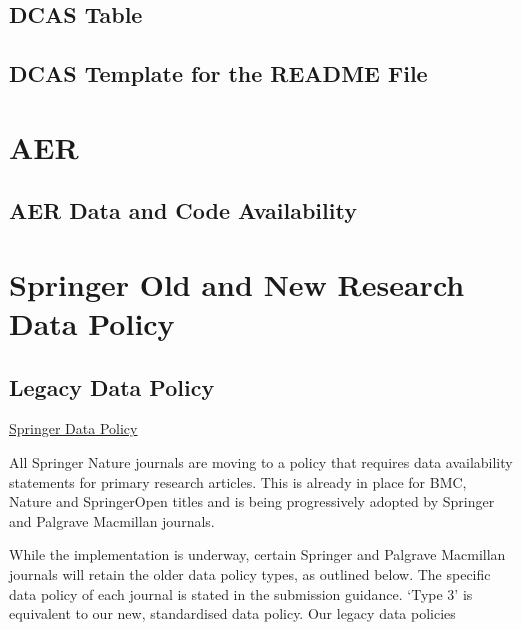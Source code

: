 \documentclass[11pt]{article}
\begin{document}
\subsection{DCAS Table}
\label{dcas_table}


   

\subsection{DCAS Template for the README File}



\section{AER}
\subsection{AER Data and Code Availability}


\section{Springer Old and New Research Data Policy}
\label{springer}
\subsection{Legacy Data Policy}

\href{https://www.springernature.com/gp/authors/research-data-policy/research-data-policy-types}{Springer Data Policy}

All Springer Nature journals are moving to a policy that requires data availability statements for primary research articles. This is already in place for BMC, Nature and SpringerOpen titles and is being progressively adopted by Springer and Palgrave Macmillan journals.

While the implementation is underway, certain Springer and Palgrave Macmillan journals will retain the older data policy types, as outlined below. The specific data policy of each journal is stated in the submission guidance. ‘Type 3’ is equivalent to our new, standardised data policy.
Our legacy data policies
\end{document}
